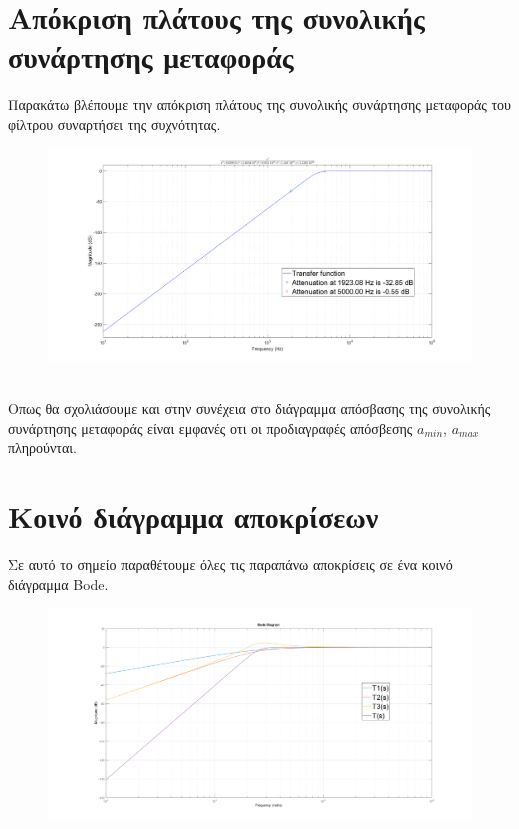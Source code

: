 \documentclass{article}
\begin{document}
{{{\section*{Aπόκριση πλάτους της συνολικής συνάρτησης μεταφοράς} 
Παρακάτω βλέπουμε την απόκριση πλάτους της συνολικής συνάρτησης μεταφοράς του φίλτρου συναρτήσει της συχνότητας.
\begin{figure}[h!]
\centering
 	\advance\leftskip-4.4cm
  \includegraphics[width=210mm,scale=1]{thema4/t.png}
\end{figure}  \\
Οπως θα σχολιάσουμε και στην συνέχεια στο διάγραμμα απόσβασης της συνολικής συνάρτησης μεταφοράς είναι εμφανές οτι οι προδιαγραφές απόσβεσης $a_{min}$, $a_{max}$ πληρούνται.
\newpage
\section*{Κοινό διάγραμμα αποκρίσεων} 
Σε αυτό το σημείο παραθέτουμε όλες τις παραπάνω αποκρίσεις σε ένα κοινό διάγραμμα Bode.
\begin{figure}[h!]
\centering
 	\advance\leftskip-5cm
  \includegraphics[width=220mm,scale=2]{thema4/tall.png}
\end{figure} 
\newpage
}}}
\end{document}
